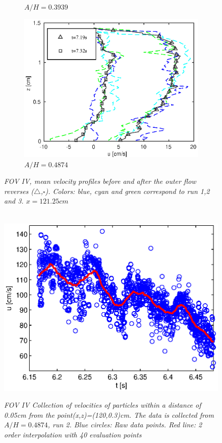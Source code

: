 \documentclass[a4paper, 11pt, english, twoside, openright]{article}
\begin{document}
\begin{figure}[]
{\begin{subfigure}[b]{.3\textwidth}
\caption{\textit{$A/H=0.3939$}}
\end{subfigure}%
\begin{subfigure}[b]{.3\textwidth}
\centering
\includegraphics[width=.95\textwidth]{./Figures/FOV_6/PIV_FOV6_case50.eps}
\caption{\textit{$A/H=0.4874$}}
\end{subfigure}%
}
\caption{\textit{FOV IV, mean velocity profiles before and after the outer flow reverses ($\triangle$,$\square$). Colors: blue, cyan and green correspond to run 1,2 and 3. 
$x=121.25cm$} }
\label{fig:PIV_FOV6}
\end{figure}
\begin{figure}[]
        \centering
        ~ %
                \includegraphics[scale=0.6]{./Figures/tid_case50_run2.eps}
                \caption{\textit{FOV IV Collection of velocities of particles within a distance of 0.05cm from the point(x,z)=(120,0.3)cm. The data is collected from  $A/H=0.4874$, run 2. Blue circles: Raw data points. Red line: 2 order interpolation with 40 evaluation points}}
                \label{fig:wave_in_time}
        \end{figure}      
\end{document}
